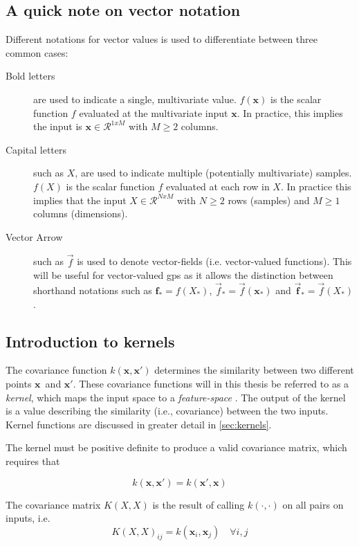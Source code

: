 \subsection{A quick note on vector notation}
Different notations for vector values is used to differentiate between three common cases:
\begin{description}
\item[Bold letters] are used to indicate a single, multivariate value. $f(\boldsymbol{x})$ is the scalar function $f$ evaluated at the multivariate input $\boldsymbol{x}$. In practice, this implies the input is $\boldsymbol{x} \in \mathcal{R}^{1 x M}$ with $M\geq 2$ columns. 
\item[Capital letters] such as $X$, are used to indicate multiple (potentially multivariate) samples. $f(X)$ is the scalar function $f$ evaluated at each row in $X$. In practice this implies that the input $X \in \mathcal{R}^{N x M}$ with $N \geq 2$ rows (samples) and $M \geq 1$ columns (dimensions).
\item[Vector Arrow] such as $\vec{f}$ is used to denote vector-fields (i.e. vector-valued functions). This will be useful for vector-valued \acrshort{gp}s as it allows the distinction between shorthand notations such as $\boldsymbol{f}_* = f(X_*)$, $\vec{f}_* = \vec{f}(\boldsymbol{x}_*)$ and $\vec{\boldsymbol{f}}_* = \vec{f}(X_*)$.
\end{description}

\subsection{Introduction to kernels}
The covariance function $k(\boldsymbol{x}, \boldsymbol{x}')$ determines the similarity between two different points $\boldsymbol{x}$ and $\boldsymbol{x}'$. These covariance functions will in this thesis be referred to as a \textit{kernel}, which maps the input space to a \textit{feature-space} \cite{rasmussen}. The output of the kernel is a value describing the similarity (i.e., covariance) between the two inputs. Kernel functions are discussed in greater detail in \cref{sec:kernels}.

The kernel must be positive definite to produce a valid covariance matrix, which requires that

\begin{equation}
    k(\boldsymbol{x}, \boldsymbol{x}') = k(\boldsymbol{x}', \boldsymbol{x})
\end{equation}

The covariance matrix $K(X, X)$ is the result of calling $k(\cdot, \cdot)$ on all pairs on inputs, i.e.
\begin{equation} 
    K(X, X)_{ij} = k(\boldsymbol{x}_i, \boldsymbol{x}_j) \quad \forall i, j
\end{equation}


